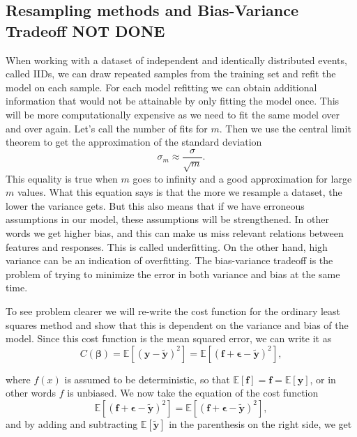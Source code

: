 \subsection{Resampling methods and Bias-Variance Tradeoff NOT DONE}
When working with a dataset of independent and identically distributed events, called IIDs, we can draw repeated samples from the training set and refit the model on each sample. For each model refitting we can obtain additional information that would not be attainable by only fitting the model once. This will be more computationally expensive as we need to fit the same model over and over again. Let's call the number of fits for $m$. Then we use the central limit theorem to get the approximation of the standard deviation
\begin{equation}\label{eq:central_limit_deviation}
\sigma_m\approx
\frac{\sigma}{\sqrt{m}}.
\end{equation}
This equality is true when $m$ goes to infinity and a good approximation for large $m$ values. What this equation says is that the more we resample a dataset, the lower the variance gets. But this also means that if we have erroneous assumptions in our model, these assumptions will be strengthened. In other words we get higher bias, and this can make us miss relevant relations between features and responses. This is called underfitting. On the other hand, high variance can be an indication of overfitting. The bias-variance tradeoff is the problem of trying to minimize the error in both variance and bias at the same time. 

To see problem clearer we will re-write the cost function for the ordinary least squares method and show that this is dependent on the variance and bias of the model. Since this cost function is the mean squared error, we can write it as
$$
C(\boldsymbol\beta) = \mathbb{E}\left[(\mathbf{y}-\mathbf{\tilde{y}})^2\right] = \mathbb{E}\left[(\mathbf{f}+\mathbf{\epsilon}-\mathbf{\tilde{y}})^2\right],
$$

where $f(x)$ is assumed to be deterministic, so that $\mathbb{E}[\mathbf{f}]=\mathbf{f}=\mathbb{E}[\mathbf{y}]$, or in other words $f$ is unbiased. We now take the equation of the cost function
$$
\mathbb{E}\left[(\mathbf{f}+\mathbf{\epsilon}-\mathbf{\tilde{y}})^2\right]=\mathbb{E}\left[(\mathbf{f}+\mathbf{\epsilon}-\mathbf{\tilde{y}})^2\right],
$$
and by adding and subtracting $\mathbb{E}\left[\mathbf{\tilde{y}}\right]$ in the parenthesis on the right side, we get

